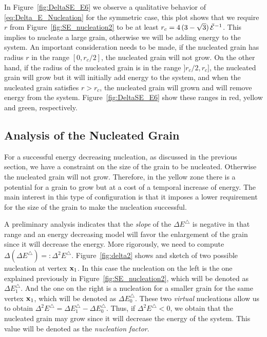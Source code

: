 %
In Figure~\ref{fig:DeltaSE_E6} we observe
a qualitative behavior of \eqref{eq:Delta_E_Nucleation} for the symmetric case, this plot shows that we require $r$ from Figure~\ref{fig:SE_nucleation2} to be at least $r_c=4\,(3 - \sqrt{3})\,\bar{\mathcal{E}}^{-1}$.
This implies to nucleate a large grain,
otherwise we will be adding energy to the system.
An important consideration needs to be made,
if the nucleated grain has radius $r$ in the range
$[0,r_c/2]$, the nucleated grain will not grow.
On the other hand, if the radius of the nucleated grain is 
in the range $]r_c/2,r_c]$,
the nucleated grain will grow but it will initially add
energy to the system,
and when the nucleated grain satisfies $r>r_c$,
the nucleated grain will grown and will
remove energy from the system.
Figure~\ref{fig:DeltaSE_E6} show
these ranges in red, yellow and green, respectively.

\subsection{Analysis of the Nucleated Grain}
For a successful energy decreasing nucleation, 
as discussed in the previous section, 
we have a constraint on the size of the grain to be nucleated.
Otherwise the nucleated grain will not grow. 
Therefore, in the yellow zone there is a potential for a grain to grow but at a cost of a temporal increase of energy. 
The main interest in this type of configuration
is that it imposes a lower requirement for the size
of the grain to make the nucleation successful.

A preliminary analysis indicates %
that the \emph{slope} of the $\Delta E^{\triangle}$ is negative in that range and an energy decreasing model will favor the enlargement of the grain since it will decrease the energy.
More rigorously, we need to compute $\Delta(\Delta E^{\triangle})=:\Delta^2 E^{\triangle}$.
Figure~\ref{fig:delta2} shows and sketch of two possible nucleation at vertex $\x_1$.
In this case the nucleation on the left is the
one explained previously in Figure~\ref{fig:SE_nucleation2},
which will be denoted as $\Delta E^{\triangle}_1$.
And the one on the right is a nucleation
for a smaller grain for the same vertex $\x_1$,
which will be denoted as $\Delta E^{\triangle}_0$.
These two \emph{virtual} nucleations allow us
to obtain $\Delta^2 E^{\triangle}=\Delta E^{\triangle}_1-\Delta E^{\triangle}_0$.
Thus, if $\Delta^2 E^{\triangle}<0$, we obtain
that the nucleated grain may grow
since it will decrease the energy of the system.
This value will be denoted as the \emph{nucleation
factor}.

